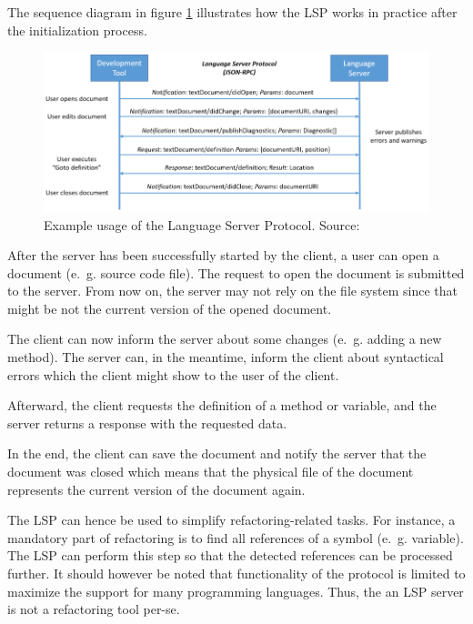 The sequence diagram in figure \ref{fig:lsp_usage} illustrates how the \ac{LSP} works in practice after the initialization process. 
\begin{figure}
    \centering
    \includegraphics{figures/chapter2/language-server-sequence.png}
    \caption{Example usage of the Language Server Protocol. Source: \cite{lsp_website} }
    \label{fig:lsp_usage}
    
\end{figure}

After the server has been successfully started by the client, a user can open a document (e.~g. source code file). The request to open the document is submitted to the server. From now on, the server may not rely on the file system since that might be not the current version of the opened document. 

The client can now inform the server about some changes (e.~g. adding a new method). The server can, in the meantime, inform the client about syntactical errors which the client might show to the user of the client.

Afterward, the client requests the definition of a method or variable, and the server returns a response with the requested data.

In the end, the client can save the document and notify the server that the document was closed which means that the physical file of the document represents the current version of the document again. 

The \ac{LSP} can hence be used to simplify refactoring-related tasks. For instance, a mandatory part of refactoring is to find all references of a symbol (e.~g. variable). The \ac{LSP} can perform this step so that the detected references can be processed further. It should however be noted that functionality of the protocol is limited to maximize the support for many programming languages. Thus, the an \ac{LSP} server is not a refactoring tool per-se. 





